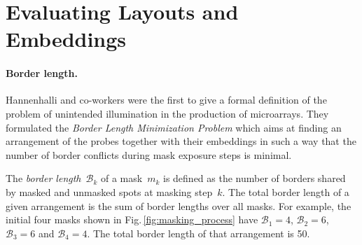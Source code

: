 \documentclass{llncs}
\begin{document}

\section{Evaluating Layouts and Embeddings}
\label{sec:eval}

\paragraph{Border length.}
Hannenhalli and co-workers \cite{HANNENHALLI02} were the first to give a
formal definition of the problem of unintended illumination in the production
of microarrays. They formulated the \emph{Border Length Minimization Problem}
which aims at finding an arrangement of the probes together with their
embeddings in such a way that the number of border conflicts during mask
exposure steps is minimal.

The \emph{border length}~$\mathcal{B}_k$ of a mask~$m_{k}$ is defined as the
number of borders shared by masked and unmasked spots at masking step~$k$. The
total border length of a given arrangement is the sum of border lengths over
all masks. For example, the initial four masks shown in
Fig.\,\ref{fig:masking_process} have $\mathcal{B}_1 = 4$, $\mathcal{B}_2 = 6$,
$\mathcal{B}_3 = 6$ and $\mathcal{B}_4 = 4$.  The total border length of that
arrangement is 50.
\end{document}
